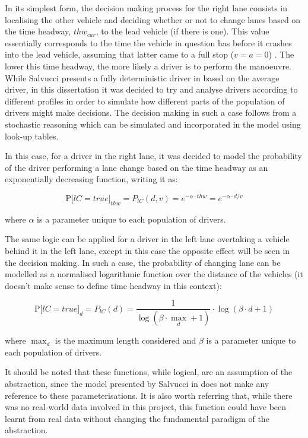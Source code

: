 In its simplest form, the decision making process for the right lane consists in localising the other vehicle and deciding whether or not to change lanes based on the time headway, $thw_{car}$, to the lead vehicle (if there is one). This value essentially corresponds to the time the vehicle in question has before it crashes into the lead vehicle, assuming that latter came to a full stop ($v = a = 0$) \cite{thw}. The lower this time headway, the more likely a driver is to perform the manoeuvre. While Salvucci presents a fully deterministic driver in \cite{salvucci_1} based on the average driver, in this dissertation it was decided to try and analyse drivers according to different profiles in order to simulate how different parts of the population of drivers might make decisions. The decision making in such a case follows from a stochastic reasoning which can be simulated and incorporated in the model using look-up tables. 

In this case, for a driver in the right lane, it was decided to model the probability of the driver performing a lane change based on the time headway as an exponentially decreasing function, writing it as:

\begin{equation}
	\text{P[}lC = true\text{]}_{thw} = P_{lC}(d,v) = e^{-\alpha\cdot thw} = e^{-\alpha\cdot d/v}
\end{equation}

where $\alpha$ is a parameter unique to each population of drivers. 

The same logic can be applied for a driver in the left lane overtaking a vehicle behind it in the left lane, except in this case the opposite effect will be seen in the decision making. In such a case, the probability of changing lane can be modelled as a normalised logarithmic function over the distance of the vehicles (it doesn't make sense to define time headway in this context):

\begin{equation}
	\text{P[}lC = true\text{]}_{d} = P_{lC}(d) = \frac{1}{\log(\beta\cdot \max_d + 1)}\cdot \log(\beta\cdot d + 1)
\end{equation}

where $\max_d$ is the maximum length considered and $\beta$ is a parameter unique to each population of drivers.

It should be noted that these functions, while logical, are an assumption of the abstraction, since the model presented by Salvucci in \cite{salvucci_1} does not make any reference to these parameterisations. It is also worth referring that, while there was no real-world data involved in this project, this function could have been learnt from real data without changing the fundamental paradigm of the abstraction.

